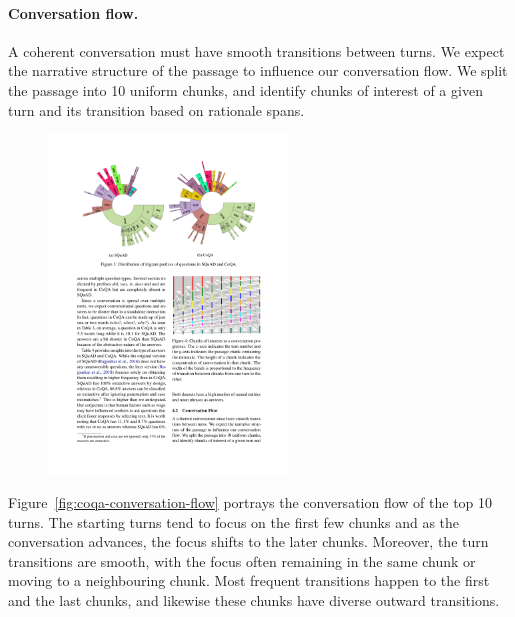 \paragraph{Conversation flow.}
A coherent conversation must have smooth transitions between turns.
We expect the narrative structure of the passage to influence our conversation flow.
We split the passage into 10 uniform chunks, and identify chunks of interest of a given turn and its transition based on rationale spans.

\begin{figure}[!t]
\begin{center}
\includegraphics[height=9cm]{img/coqa_conversation_flow.pdf}
\end{center}
\end{figure}


Figure~\ref{fig:coqa-conversation-flow} portrays the conversation flow of the top 10 turns.
The starting turns tend to focus on the first few chunks and as the conversation advances, the focus shifts to the later chunks. Moreover, the turn transitions are smooth, with the focus often remaining in the same chunk or moving to a neighbouring chunk. Most frequent transitions happen to the first and the last chunks, and likewise these chunks have diverse outward transitions.

